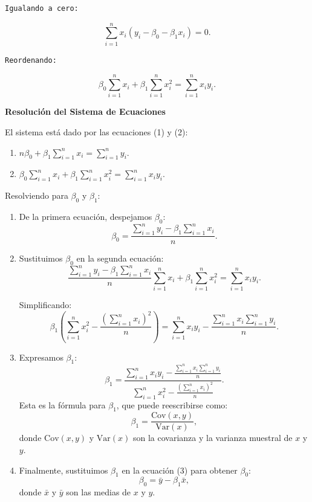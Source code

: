 \documentclass[
  letterpaper,
  DIV=11,
  numbers=noendperiod]{scrreprt}
\providecommand{\tightlist}{%
  \setlength{\itemsep}{0pt}\setlength{\parskip}{0pt}}
\begin{document}
\begin{tcolorbox}
\begin{verbatim}
Igualando a cero: 
\end{verbatim}

\[ 
    \sum_{i=1}^n x_i \left(y_i - \beta_0 -
    \beta_1 x_i\right) = 0. 
   \]

\begin{verbatim}
Reordenando: 
\end{verbatim}

\[
    \beta_0 \sum_{i=1}^n x_i + \beta_1 \sum_{i=1}^n x_i^2 = \sum_{i=1}^n x_i y_i. \tag{2}
   \]

\textbf{Resolución del Sistema de Ecuaciones}

El sistema está dado por las ecuaciones (1) y (2):

\begin{enumerate}
\def\labelenumi{\arabic{enumi}.}
\tightlist
\item
  \(n\beta_0 + \beta_1 \sum_{i=1}^n x_i = \sum_{i=1}^n y_i.\)\\
\item
  \(\beta_0 \sum_{i=1}^n x_i + \beta_1 \sum_{i=1}^n x_i^2 = \sum_{i=1}^n x_i y_i.\)
\end{enumerate}

Resolviendo para \(\beta_0\) y \(\beta_1\):

\begin{enumerate}
\def\labelenumi{\arabic{enumi}.}
\item
  De la primera ecuación, despejamos \(\beta_0\):\\
  \[
  \beta_0 = \frac{\sum_{i=1}^n y_i - \beta_1 \sum_{i=1}^n x_i}{n}. \tag{3}
  \]
\item
  Sustituimos \(\beta_0\) en la segunda ecuación:\\
  \[
  \frac{\sum_{i=1}^n y_i - \beta_1 \sum_{i=1}^n x_i}{n} \sum_{i=1}^n x_i + \beta_1 \sum_{i=1}^n x_i^2 = \sum_{i=1}^n x_i y_i.
  \]

  Simplificando:\\
  \[
  \beta_1 \left(\sum_{i=1}^n x_i^2 - \frac{(\sum_{i=1}^n x_i)^2}{n}\right) = \sum_{i=1}^n x_i y_i - \frac{\sum_{i=1}^n x_i \sum_{i=1}^n y_i}{n}.
  \]
\item
  Expresamos \(\beta_1\):\\
  \[
  \beta_1 = \frac{\sum_{i=1}^n x_i y_i - \frac{\sum_{i=1}^n x_i \sum_{i=1}^n y_i}{n}}{\sum_{i=1}^n x_i^2 - \frac{(\sum_{i=1}^n x_i)^2}{n}}.
  \] Esta es la fórmula para \(\beta_1\), que puede reescribirse como:\\
  \[
  \beta_1 = \frac{\text{Cov}(x, y)}{\text{Var}(x)},
  \] donde \(\text{Cov}(x, y)\) y \(\text{Var}(x)\) son la covarianza y
  la varianza muestral de \(x\) y \(y\).
\item
  Finalmente, sustituimos \(\beta_1\) en la ecuación (3) para obtener
  \(\beta_0\):\\
  \[
  \beta_0 = \bar{y} - \beta_1 \bar{x},
  \] donde \(\bar{x}\) y \(\bar{y}\) son las medias de \(x\) y \(y\).
\end{enumerate}

\end{tcolorbox}
\end{document}

